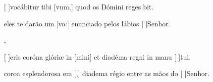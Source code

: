 {  {\item {}[ ]{vo}cábitur tibi [vum,] quod os Dómini reges bit.~\Antiphona}%
    {\item {} eles te darão um [vo:] enunciado pelos lábios [ ]{Se}{nhor}.~\Antiphona},
  {\item {}[ ]{e}ris coróna glóriæ in [mini] et diadéma regni in manu [ ]{tu}i.~\Antiphona}%
    {\item {} coroa esplendorosa em [,] diadema régio entre as mãos do [ ]{Se}{nhor}.~\Antiphona}
}